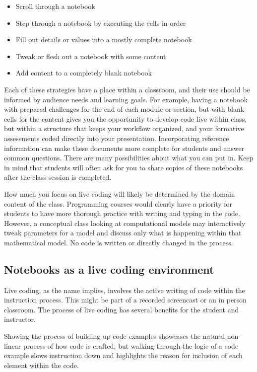 \documentclass[]{book}
\providecommand{\tightlist}{%
  \setlength{\itemsep}{0pt}\setlength{\parskip}{0pt}}
\begin{document}
\begin{itemize}
\tightlist
\item
  Scroll through a notebook
\item
  Step through a notebook by executing the cells in order
\item
  Fill out details or values into a mostly complete notebook
\item
  Tweak or flesh out a notebook with some content
\item
  Add content to a completely blank notebook
\end{itemize}

Each of these strategies have a place within a classroom, and their use should
be informed by audience needs and learning goals. For example, having a notebook
with prepared challenges for the end of each module or section, but with blank
cells for the content gives you the opportunity to develop code live within
class, but within a structure that keeps your workflow organized, and your
formative assessments coded directly into your presentation. Incorporating
reference information can make these documents more complete for students and
answer common questions. There are many possibilities about what you can put in.
Keep in mind that students will often ask for you to share copies of these
notebooks after the class session is completed.

How much you focus on live coding will likely be determined by the domain
content of the class. Programming courses would clearly have a priority for
students to have more thorough practice with writing and typing in the code.
However, a conceptual class looking at computational models may interactively
tweak parameters for a model and discuss only what is happening within that
mathematical model. No code is written or directly changed in the process.

\hypertarget{notebooks-as-a-live-coding-environment}{%
\subsection{Notebooks as a live coding environment}\label{notebooks-as-a-live-coding-environment}}

Live coding, as the name implies, involves the active writing of code within the
instruction process. This might be part of a recorded screencast or an in person
classroom. The process of live coding has several benefits for the student and
instructor.

Showing the process of building up code examples showcases the natural
non-linear process of how code is crafted, but walking through the logic of a
code example slows instruction down and highlights the reason for inclusion of
each element within the code.
\end{document}
